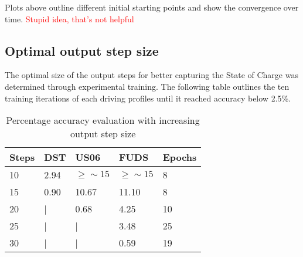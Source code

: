     Plots above outline different initial starting points and show the convergence over time. \textcolor{red}{Stupid idea, that's not helpful}
\subsection{Optimal output step size}
    The optimal size of the output steps for better capturing the State of Charge was determined through experimental training.
    The following table outlines the ten training iterations of each driving profiles until it reached accuracy below 2.5\%.
    \begin{table}[htbp]
        \centering
        \caption{Percentage accuracy evaluation with increasing output step size}
        \label{tab:out_steps}
        \begin{tabular}{ p{1.5cm} || p{1.5cm} p{1.5cm} p{1.5cm} || p{1.5cm}  }
            \hline
            Steps & DST & US06 & FUDS & Epochs \\
            \hline
            10 & 2.94 & $\geq\sim 15$ & $\geq\sim 15$ & 8 \\
            15 & 0.90 & 10.67  & 11.10  & 8 \\
            20 & |    & 0.68   &  4.25  & 10 \\
            25 & |    & |      &  3.48  & 25 \\
            30 & |    & |      &  0.59  & 19 \\
            \hline
        \end{tabular}
    \end{table}
    
